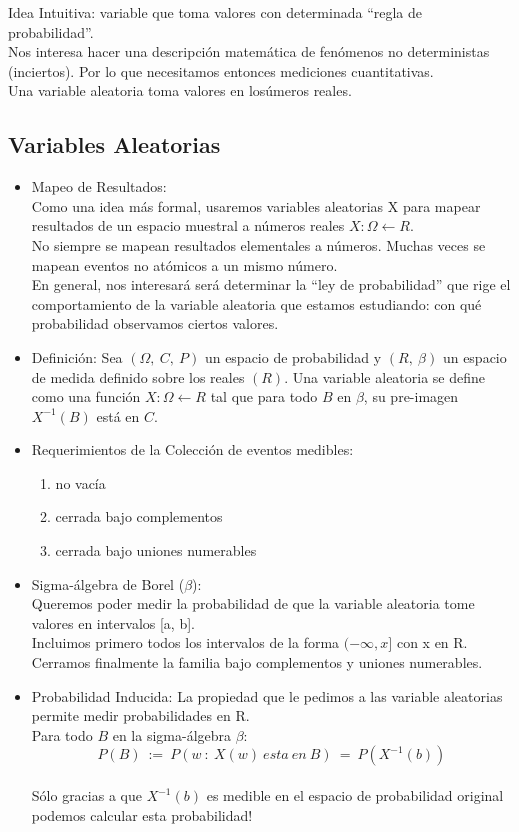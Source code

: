 	Idea Intuitiva: variable que toma valores con determinada ``regla de probabilidad''.\\
	Nos interesa hacer una descripci\'on matem\'atica de fen\'omenos no deterministas (inciertos). Por lo que necesitamos entonces mediciones cuantitativas.\\
	Una variable aleatoria toma valores en los\'umeros reales.

	\subsection{Variables Aleatorias}
		\begin{itemize}
			\item Mapeo de Resultados:\\
				Como una idea m\'as formal, usaremos variables aleatorias X para mapear resultados de un espacio muestral a n\'umeros reales $X: \Omega \leftarrow R$.\\
				No siempre se mapean resultados elementales a n\'umeros. Muchas veces se mapean eventos no at\'omicos a un mismo n\'umero.\\
				En general, nos interesar\'a ser\'a determinar la ``ley de probabilidad'' que rige el comportamiento de la variable aleatoria que estamos estudiando: con qu\'e probabilidad observamos ciertos valores.
			\item Definici\'on:
                             Sea $(\Omega,\ C,\ P)$ un espacio de probabilidad y $(R,\ \beta)$ un espacio de medida definido sobre los reales $(R)$. Una variable aleatoria se define como una funci\'on $X: \Omega \leftarrow R$ tal que para todo $B$ en $\beta$, su pre-imagen $X^{-1}(B)$ est\'a en $C$.
			\item Requerimientos de la Colecci\'on de eventos medibles:
			\begin{enumerate}
				\item no vac\'ia
				\item cerrada bajo complementos
				\item cerrada bajo uniones numerables
			\end{enumerate}
			\item Sigma-\'algebra de Borel ($\beta$):\\
				Queremos poder medir la probabilidad de que la variable aleatoria tome valores en intervalos [a, b].\\
				Incluimos primero todos los intervalos de la forma $(-\infty, x]$ con x en R.\\
  				Cerramos finalmente la familia bajo complementos y uniones numerables.
			\item Probabilidad Inducida: La propiedad que le pedimos a las variable aleatorias permite medir probabilidades en R.\\
				Para todo $B$ en la sigma-\'algebra $\beta$: $$P(B)\ :=\ P(w\ :\ X(w)\ esta\ en\ B)\ =\ P(X^{-1}(b))$$ \\
				S\'olo gracias a que $X^{-1}(b)$ es medible en el espacio de probabilidad original podemos calcular esta probabilidad!
		\end{itemize}
